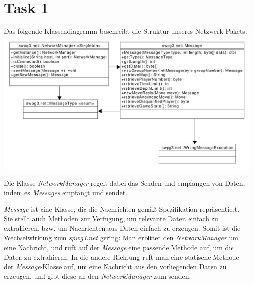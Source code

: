 \section{Task 1}
Das folgende Klassendiagramm beschreibt die Struktur unseres Netzwerk Pakets:
\includegraphics[scale=0.5]{NetPackageClassdiagramm.pdf}

Die Klasse \textit{NetworkManager} regelt dabei das Senden und empfangen von Daten, indem es \textit{Messages} empfängt und sendet.

\textit{Message} ist eine Klasse, die die Nachrichten gemäß Spezifikation repräsentiert. Sie stellt auch Methoden zur Verfügung, um relevante Daten einfach zu extrahieren, bzw. um Nachrichten aus Daten einfach zu erzeugen. Somit ist die Wechselwirkung zum \textit{spwg3.net} gering: Man erbittet den \textit{NetworkManager} um eine Nachricht, und ruft auf der \textit{Message} eine passende Methode auf, um die Daten zu extrahieren. In die andere Richtung ruft man eine statische Methode der \textit{Message}-Klasse auf, um eine Nachricht aus den vorliegenden Daten zu erzeugen, und gibt diese an den \textit{NetworkManager} zum senden.